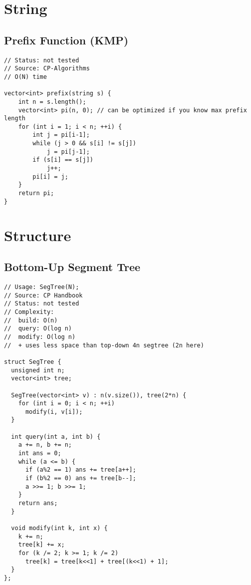 \documentclass[12pt, a4paper, twoside]{article}
\begin{document}

\section{String}

\subsection{Prefix Function (KMP)}
\begin{lstlisting}
// Status: not tested
// Source: CP-Algorithms
// O(N) time

vector<int> prefix(string s) {
	int n = s.length();
	vector<int> pi(n, 0); // can be optimized if you know max prefix length
	for (int i = 1; i < n; ++i) {
		int j = pi[i-1];
		while (j > 0 && s[i] != s[j])
			j = pi[j-1];
		if (s[i] == s[j])
			j++;
		pi[i] = j;
	}
	return pi;
}
\end{lstlisting}



\section{Structure}

\subsection{Bottom-Up Segment Tree}
\begin{lstlisting}
// Usage: SegTree(N);
// Source: CP Handbook
// Status: not tested
// Complexity:
//  build: O(n)
//  query: O(log n)
//  modify: O(log n)
//  + uses less space than top-down 4n segtree (2n here)

struct SegTree {
  unsigned int n;
  vector<int> tree;

  SegTree(vector<int> v) : n(v.size()), tree(2*n) {
    for (int i = 0; i < n; ++i)
      modify(i, v[i]);
  }

  int query(int a, int b) {
    a += n, b += n;
    int ans = 0;
    while (a <= b) {
      if (a%2 == 1) ans += tree[a++];
      if (b%2 == 0) ans += tree[b--];
      a >>= 1; b >>= 1;
    }
    return ans;
  }

  void modify(int k, int x) {
    k += n;
    tree[k] += x;
    for (k /= 2; k >= 1; k /= 2)
      tree[k] = tree[k<<1] + tree[(k<<1) + 1];
  }
};
\end{lstlisting}
\end{document}
